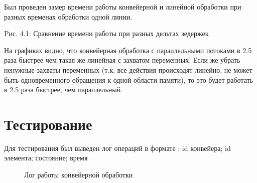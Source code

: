 \documentclass[12pt]{report}
\begin{document}
Был проведен замер времени работы конвейерной и линейной обработки при разных временах обработки одной линии.
 
\begin{center}
Pис. 4.1: Сравнение времени работы при разных дельтах зедержек
\end{center}


На графиках видно, что конвейерная обработка с параллельными потоками в 2.5 раза быстрее чем такая же линейная с захватом переменных.
Если же убрать ненужные захваты переменных (т.к. все действия происходят линейно, не может быть одновременного обращения к одной области памяти), то это будет работать в 2.5 раза быстрее, чем параллельный.

\section{Тестирование}
Для тестирования был выведен лог операций в формате : 
id конвейера; id элемента; состояние; время

\begin{figure}[h]
	\caption{Лог работы конвейерной обработки}
	\label{fig:v_st}
\end{figure}
\end{document}

